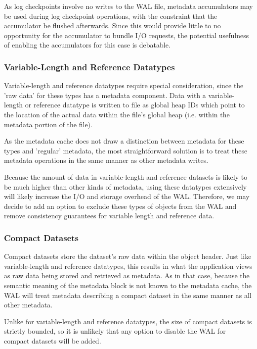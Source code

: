 As log checkpoints involve no writes to the WAL file, metadata accumulators may be used during log checkpoint operations, with the constraint that the accumulator be flushed afterwards. Since this would provide little to no opportunity for the accumulator to bundle I/O requests, the potential usefulness of enabling the accumulators for this case is debatable.


\subsubsection{Variable-Length and Reference Datatypes}

Variable-length and reference datatypes require special consideration, since the 'raw data' for these types has a metadata component. Data with a variable-length or reference datatype is written to file as global heap IDs which point to the location of the actual data within the file's global heap (i.e. within the metadata portion of the file).

As the metadata cache does not draw a distinction between metadata for these types and 'regular' metadata, the most straightforward solution is to treat these metadata operations in the same manner as other metadata writes. 

Because the amount of data in variable-length and reference datasets is likely to be much higher than other kinds of metadata, using these datatypes extensively will likely increase the I/O and storage overhead of the WAL. Therefore, we may decide to add an option to exclude these types of objects from the WAL and remove consistency guarantees for variable length and reference data.

\subsubsection{Compact Datasets}

Compact datasets store the dataset's raw data within the object header. Just like variable-length and reference datatypes, this results in what the application views as raw data being stored and retrieved as metadata. As in that case, because the semantic meaning of the metadata block is not known to the metadata cache, the WAL will treat metadata describing a compact dataset in the same manner as all other metadata.

Unlike for variable-length and reference datatypes, the size of compact datasets is strictly bounded, so it is unlikely that any option to disable the WAL for compact datasets will be added.

